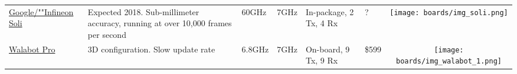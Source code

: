 \begin{longtable}[]{@{}llllllc@{}}
\begin{minipage}[t]{\colwidthA}\raggedright\strut
	\href{https://www.infineon.com/cms/en/product/promopages/soli/}{Google/""Infineon Soli}
\strut\end{minipage} &
\begin{minipage}[t]{\colwidthB}\raggedright\strut
Expected 2018. Sub-millimeter accuracy, running at over 10,000 frames per second \cite{Lien2016}
\strut\end{minipage} &
\begin{minipage}[t]{\colwidthC}\raggedright\strut
60GHz
\strut\end{minipage} &
\begin{minipage}[t]{\colwidthD}\raggedright\strut
7GHz
\strut\end{minipage} &
\begin{minipage}[t]{\colwidthE}\raggedright\strut
In-package, 2 Tx, 4 Rx
\strut\end{minipage} &
\begin{minipage}[t]{\colwidthF}\raggedright\strut
?
\strut\end{minipage} &
\begin{minipage}[t]{\colwidthG}\centering\strut
\texttt{[image: boards/img\_soli.png]}
\strut\end{minipage}\tabularnewline

\begin{minipage}[t]{\colwidthA}\raggedright\strut
	\href{https://walabot.com/store/us/products/walabot-developer-pack.html}{Walabot Pro}
\strut\end{minipage} &
\begin{minipage}[t]{\colwidthB}\raggedright\strut
3D configuration. Slow update rate
\strut\end{minipage} &
\begin{minipage}[t]{\colwidthC}\raggedright\strut
6.8GHz
\strut\end{minipage} &
\begin{minipage}[t]{\colwidthD}\raggedright\strut
7GHz
\strut\end{minipage} &
\begin{minipage}[t]{\colwidthE}\raggedright\strut
On-board, 9 Tx, 9 Rx
\strut\end{minipage} &
\begin{minipage}[t]{\colwidthF}\raggedright\strut
\$599
\strut\end{minipage} &
\begin{minipage}[t]{\colwidthG}\centering\strut
\texttt{[image: boards/img\_walabot\_1.png]}
\strut\end{minipage}\tabularnewline


\end{longtable}
